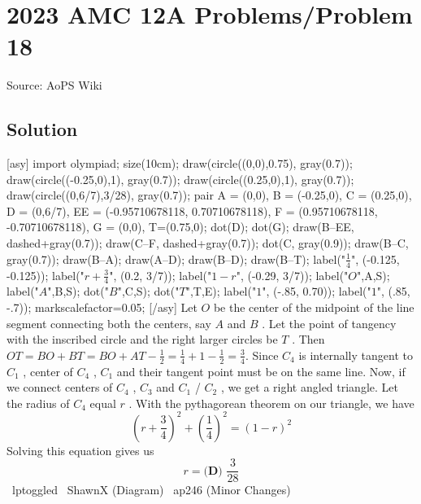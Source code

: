 \documentclass[12pt]{article}
\begin{document}
\section*{{2023 AMC 12A Problems/Problem 18}}
Source: AoPS Wiki

\subsection*{Solution}
[asy] import olympiad; size(10cm); draw(circle((0,0),0.75), gray(0.7)); draw(circle((-0.25,0),1), gray(0.7)); draw(circle((0.25,0),1), gray(0.7)); draw(circle((0,6/7),3/28), gray(0.7)); pair A = (0,0), B = (-0.25,0), C = (0.25,0), D = (0,6/7), EE = (-0.95710678118, 0.70710678118), F = (0.95710678118, -0.70710678118), G = (0,0), T=(0.75,0); dot(D); dot(G); draw(B--EE, dashed+gray(0.7)); draw(C--F, dashed+gray(0.7)); dot(C, gray(0.9)); draw(B--C, gray(0.7)); draw(B--A); draw(A--D); draw(B--D); draw(B--T); label("$\frac{1}{4}$", (-0.125, -0.125)); label("$r + \frac{3}{4}$", (0.2, 3/7)); label("$1 - r$", (-0.29, 3/7)); label("$O$",A,S); label("$A$",B,S); dot("$B$",C,S); dot("$T$",T,E); label("$1$", (-.85, 0.70)); label("$1$", (.85, -.7)); markscalefactor=0.05; [/asy] Let $O$ be the center of the midpoint of the line segment connecting both the centers, say $A$ and $B$ . Let the point of tangency with the inscribed circle and the right larger circles be $T$ . Then $OT = BO + BT = BO + AT - \frac{1}{2} = \frac{1}{4} + 1 - \frac{1}{2} = \frac{3}{4}.$ Since $C_4$ is internally tangent to $C_1$ , center of $C_4$ , $C_1$ and their tangent point must be on the same line. Now, if we connect centers of $C_4$ , $C_3$ and $C_1$ / $C_2$ , we get a right angled triangle. Let the radius of $C_4$ equal $r$ . With the pythagorean theorem on our triangle, we have \[\left(r+\frac{3}{4}\right)^2+\left(\frac{1}{4}\right)^2=(1-r)^2\] Solving this equation gives us \[r = \boxed{\textbf{(D) } \frac{3}{28}}\] ~lptoggled ~ShawnX (Diagram) ~ap246 (Minor Changes)
\end{document}

